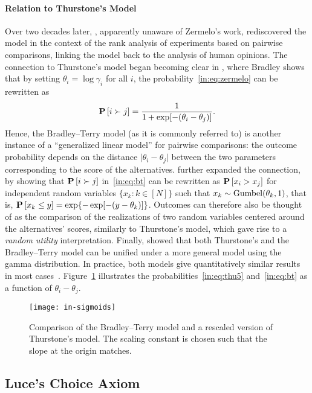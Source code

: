 \paragraph{Relation to Thurstone's Model}
Over two decades later, \citet{bradley1952rank}, apparently unaware of Zermelo's work, rediscovered the model in the context of the rank analysis of experiments based on pairwise comparisons, linking the model back to the analysis of human opinions.
The connection to Thurstone's model began becoming clear in \citet{bradley1953some}, where Bradley shows that by setting $\theta_i = \log \gamma_i$ for all $i$, the probability~\eqref{in:eq:zermelo} can be rewritten as
\begin{align}
\label{in:eq:bt}
\mathbf{P}\left[ i \succ j \right] = \frac{1}{1 + \exp[-(\theta_i - \theta_j)]}.
\end{align}
Hence, the Bradley--Terry model (as it is commonly referred to) is another instance of a ``generalized linear model'' for pairwise comparisons: the outcome probability depends on the distance $\lvert \theta_i - \theta_j \rvert$ between the two parameters corresponding to the score of the alternatives.
\citet{yellot1977relationship} further expanded the connection, by showing that $\mathbf{P}\left[ i \succ j \right]$ in~\eqref{in:eq:bt} can be rewritten as $\mathbf{P}\left[ x_i > x_j \right]$ for independent random variables $\{x_k : k \in [N]\}$ such that $x_k \sim \mathrm{Gumbel}( \theta_k, 1 )$, that is, $\mathbf{P}\left[ x_k \le y \right] = \exp\{-\exp[-(y - \theta_k)]\}$.
Outcomes can therefore also be thought of as the comparison of the realizations of two random variables centered around the alternatives' scores, similarly to Thurstone's model, which gave rise to a \emph{random utility} interpretation.
Finally, \citet{stern1992all} showed that both Thurstone's and the Bradley--Terry model can be unified under a more general model using the gamma distribution.
In practice, both models give quantitatively similar results in most cases~\citep{tsukida2011how}.
Figure~\ref{in:fig:sigmoids} illustrates the probabilities~\eqref{in:eq:thu5} and~\eqref{in:eq:bt} as a function of $\theta_i - \theta_j$.

\begin{figure}[ht]
\centering
\texttt{[image: in-sigmoids]}
\caption{
Comparison of the Bradley--Terry model and a rescaled version of Thurstone's model.
The scaling constant is chosen such that the slope at the origin matches.
}
\label{in:fig:sigmoids}
\end{figure}


\subsection{Luce's Choice Axiom}


